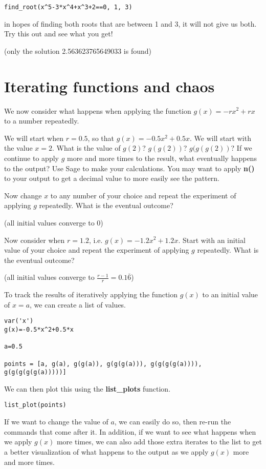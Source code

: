 \begin{verbatim}
find_root(x^5-3*x^4+x^3+2==0, 1, 3)
\end{verbatim}

in hopes of finding both roots that are between 1 and 3, it will not
give us both. Try this out and see what you get!

(only the solution 2.563623765649033 is found)

\section{Iterating functions and chaos}

We now consider what happens when applying the function $g(x)=-rx^2+rx$
to a number repeatedly.

We will start when $r=0.5$, so that $g(x)=-0.5x^2+0.5x$. We will start with
the value $x=2$. What is the value of $g(2)$? $g(g(2))$? $g(g(g(2))$?
If we continue to apply $g$ more and more times to the result, what eventually
happens to the output? Use Sage to make your calculations. You may want to
apply \textbf{n()} to your output to get a decimal value to more easily
see the pattern.

Now change $x$ to any number of your choice and repeat the experiment of
applying $g$ repeatedly. What is the eventual outcome?

(all initial values converge to $0$)

Now consider when $r=1.2$, i.e. $g(x)=-1.2x^2+1.2x$.
Start with an initial value of your choice and repeat
the experiment of applying $g$ repeatedly. What is the eventual outcome?

(all initial values converge to $\frac{r-1}{r}=0.1\bar{6}$)

To track the results of iteratively applying the function $g(x)$ to an initial
value of $x=a$, we can create a list of values.

\begin{verbatim}
var('x')
g(x)=-0.5*x^2+0.5*x

a=0.5

points = [a, g(a), g(g(a)), g(g(g(a))), g(g(g(g(a)))), g(g(g(g(g(a)))))]
\end{verbatim}

We can then plot this using the \textbf{list\_plots} function.

\begin{verbatim}
list_plot(points)
\end{verbatim}

If we want to change the value of $a$, we can easily do so, then re-run
the commands that come after it. In addition, if we want to see what
happens when we apply $g(x)$ more times, we can also add those
extra iterates to the list to get a better visualization of what happens
to the output as we apply $g(x)$ more and more times.

